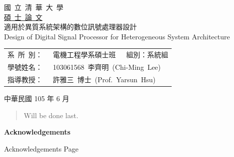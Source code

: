 \documentclass[12pt]{article}
\begin{document}
\begin{CJK}{UTF8}{bkai}

\begin{titlepage}
\begin{center}
\Huge 國~立~清~華~大~學 \\ [1.5ex]
\Huge \underline{碩~士~論~文} \\
\vspace*{10ex}
\huge 適用於異質系統架構的數位訊號處理器設計 \\
\vspace*{1ex}
\huge Design of Digital Signal Processor for Heterogeneous System Architecture  \\

\null
\vfill

\Large
\begin{tabular}{r@{\centering} @{}l}
    系\ 所\ 別：~&電機工程學系碩士班\ \ \ 組別：系統組	\\ [1.5ex]
    學號姓名：~&103061568~李齊明~(Chi-Ming~Lee)      \\ [1.5ex]
    指導教授：~&許雅三~博士~(Prof.~Yarsun~Hsu)       \\
	
\end{tabular}

\vspace*{2ex}
\Large 中華民國 105 年 6 月
\end{center}
\end{titlepage}

\doublespacing
{}
\setcounter{page}{3}

\renewcommand{\abstractnamefont}{\normalfont\bfseries}
\renewcommand{\abstracttextfont}{\normalfont}
\setlength{\absleftindent}{0pt}
\setlength{\absrightindent}{0pt}

\begin{abstract}  %
	Will be done last.
\end{abstract}
\clearpage
{}

\begin{center}
\textbf{Acknowledgements}
\end{center}
Acknowledgements Page
\clearpage

\singlespacing

\tableofcontents  %
\clearpage
{}
\listoffigures  %
\clearpage
{}
\listoftables  %
\clearpage


\end{CJK}
\end{document}
